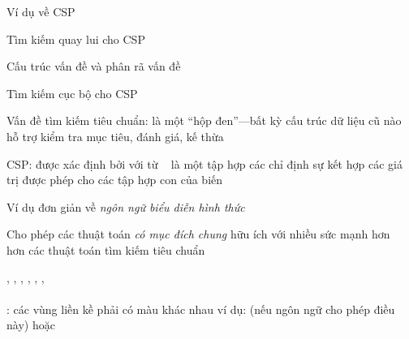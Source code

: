 \documentclass{article}
\begin{document}
\begin{huge}

\sf


\blob Ví dụ về CSP

\blob Tìm kiếm quay lui cho CSP

\blob Cấu trúc vấn đề và phân rã vấn đề

\blob Tìm kiếm cục bộ cho CSP





Vấn đề tìm kiếm tiêu chuẩn:\al
{} là một ``hộp đen''---bất kỳ cấu trúc dữ liệu cũ nào\nl
hỗ trợ kiểm tra mục tiêu, đánh giá, kế thừa

CSP:\al
{} được xác định bởi  
   với  từ  \al
\ \al
{} là một tập hợp các  chỉ định\nl
   sự kết hợp các giá trị được phép cho các tập hợp con của biến

Ví dụ đơn giản về \emph{ngôn ngữ biểu diễn hình thức}

Cho phép các thuật toán \emph{có mục đích chung } hữu ích với nhiều sức mạnh hơn \\
hơn các thuật toán tìm kiếm tiêu chuẩn



\vspace*{-0.0in}

\textwidth
{}

\vspace*{-0.6in}

 , , , , , ,  \\
 \\
: các vùng liền kề phải có màu khác nhau\al
ví dụ:  (nếu ngôn ngữ cho phép điều này) hoặc \al
{}



\end{huge}
\end{document}
